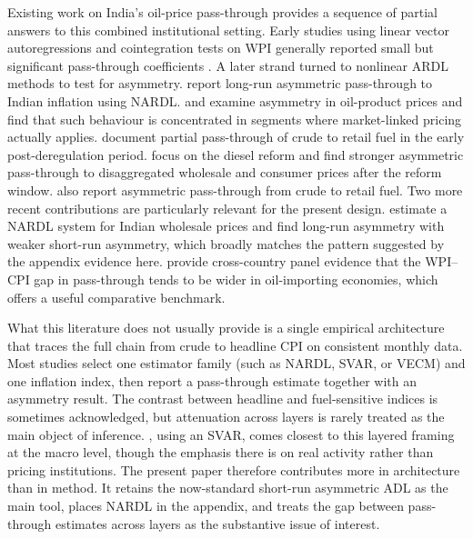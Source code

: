 \documentclass[11pt,a4paper]{article}
\begin{document}
Existing work on India’s oil-price pass-through provides a sequence of partial answers to this combined institutional setting. Early studies using linear vector autoregressions and cointegration tests on WPI generally reported small but significant pass-through coefficients \citep{bhoi2012,bhanumurthy2012}. A later strand turned to nonlinear ARDL methods to test for asymmetry. \citet{abubakar2018} report long-run asymmetric pass-through to Indian inflation using NARDL. \citet{chattopadhyay2015} and \citet{pal2016} examine asymmetry in oil-product prices and find that such behaviour is concentrated in segments where market-linked pricing actually applies. \citet{pandey2019} document partial pass-through of crude to retail fuel in the early post-deregulation period. \citet{pradeep2022} focus on the diesel reform and find stronger asymmetric pass-through to disaggregated wholesale and consumer prices after the reform window. \citet{deheri2024} also report asymmetric pass-through from crude to retail fuel. Two more recent contributions are particularly relevant for the present design. \citet{suresh2026} estimate a NARDL system for Indian wholesale prices and find long-run asymmetry with weaker short-run asymmetry, which broadly matches the pattern suggested by the appendix evidence here. \citet{sek2019} provide cross-country panel evidence that the WPI--CPI gap in pass-through tends to be wider in oil-importing economies, which offers a useful comparative benchmark.

What this literature does not usually provide is a single empirical architecture that traces the full chain from crude to headline CPI on consistent monthly data. Most studies select one estimator family (such as NARDL, SVAR, or VECM) and one inflation index, then report a pass-through estimate together with an asymmetry result. The contrast between headline and fuel-sensitive indices is sometimes acknowledged, but attenuation across layers is rarely treated as the main object of inference. \citet{sadath2021}, using an SVAR, comes closest to this layered framing at the macro level, though the emphasis there is on real activity rather than pricing institutions. The present paper therefore contributes more in architecture than in method. It retains the now-standard short-run asymmetric ADL as the main tool, places NARDL in the appendix, and treats the gap between pass-through estimates across layers as the substantive issue of interest.
\end{document}
